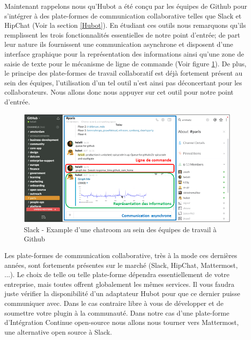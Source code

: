         Maintenant rappelons nous qu'Hubot a été conçu par les équipes de Github pour s'intégrer à des plate-formes de communication collaborative telles que Slack et HipChat (Voir la section \ref{Hubot}). En étudiant ces outils nous remarquons qu'ils remplissent les trois fonctionnalités essentielles de notre point d'entrée; de part leur nature ils fournissent une communication asynchrone et disposent d'une interface graphique pour la représentation des informations ainsi qu'une zone de saisie de texte pour le mécanisme de ligne de commande (Voir figure {\ref{Slack}}). De plus, le principe des plate-formes de travail collaboratif est déjà fortement présent au sein des équipes, l'utilisation d'un tel outil n'est ainsi pas déconcertant pour les collaborateurs. Nous allons donc nous appuyer sur cet outil pour notre point d'entrée.\\

        \begin{figure}
          \begin{center}
            \includegraphics[scale=0.5]{images/Slack.png}
          \end{center}
          \caption{Slack - Example d'une chatroom au sein des équipes de travail à Github}
          \label{Slack}
        \end{figure}

        Les plate-formes de communication collaborative, très à la mode ces dernières années, sont fortements présentes sur le marché (Slack, HipChat, Mattermost, ...). Le choix de telle ou telle plate-forme dépendra essentiellement de votre entreprise, mais toutes offrent globalement les mêmes services. Il vous faudra juste vérifier la disponibilité d'un adaptateur Hubot pour que ce dernier puisse communiquer avec. Dans le cas contraire libre à vous de développer et de soumettre votre plugin à la communauté. Dans notre cas d'une plate-forme d'Intégration Continue open-source nous allons nous tourner vers Mattermost, une alternative open source à Slack.

